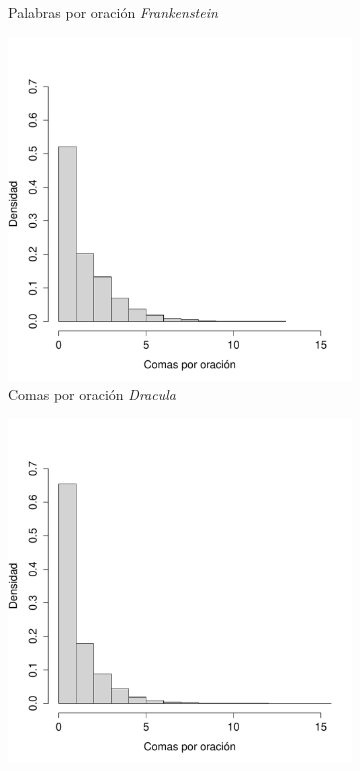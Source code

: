 \documentclass[paper=leter, fontsize=11pt]{scrartcl}
\numberwithin{equation}{section}		%
\numberwithin{figure}{section}			%
\numberwithin{table}{section}				%
\begin{document}
\begin{figure}
\begin{subfigure}{0.5\textwidth}
        \caption{Palabras por oración \textit{Frankenstein}}
        \label{fra_palabras}
    \end{subfigure}
            \begin{subfigure}{.5\textwidth}
        \centering
        \includegraphics[scale=0.4]{dra_comas.pdf}
        \caption{Comas por oración \textit{Dracula}}
        \label{dra_comas}
    \end{subfigure}
    \begin{subfigure}{0.5\textwidth}
        \centering
        \includegraphics[scale=0.4]{fra_comas.pdf}

\end{subfigure}
\end{figure}
\end{document}
